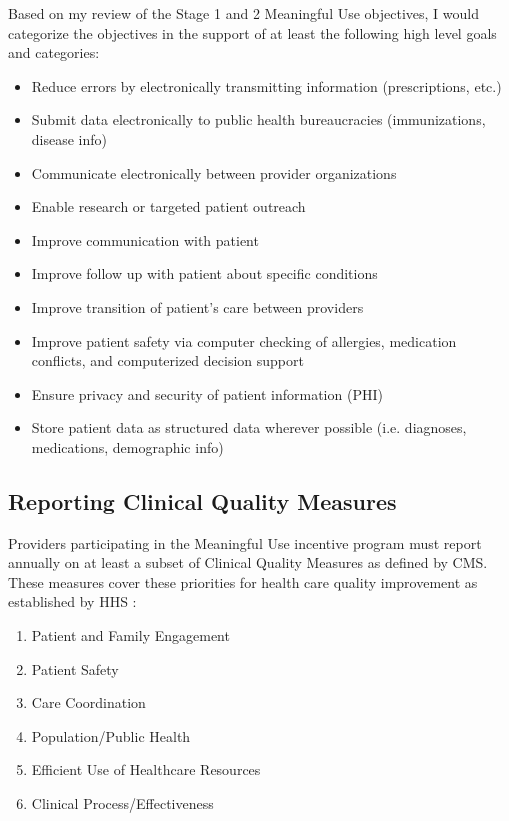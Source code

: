 \documentclass[10pt]{article}
\begin{document}


Based on my review of the Stage 1 and 2 Meaningful Use objectives, I would categorize the objectives in the support of at least the following high level goals and categories:
\begin{itemize}
	\item Reduce errors by electronically transmitting information (prescriptions, etc.)
	\item Submit data electronically to public health bureaucracies (immunizations, disease info)
	\item Communicate electronically between provider organizations
	\item Enable research or targeted patient outreach
	\item Improve communication with patient
	\item Improve follow up with patient about specific conditions
	\item Improve transition of patient's care between providers
	\item Improve patient safety via computer checking of allergies, medication conflicts, and computerized decision support
	\item Ensure privacy and security of patient information (PHI)
	\item Store patient data as structured data wherever possible (i.e. diagnoses, medications, demographic info)
\end{itemize}

\subsection{Reporting Clinical Quality Measures}
\label{sec:CQM}



Providers participating in the Meaningful Use incentive program must report annually on at least a subset of Clinical Quality Measures as defined by CMS.
These measures cover these priorities for health care quality improvement as established by HHS \cite{cqm-intro}:
\begin{enumerate}
	\item Patient and Family Engagement
	\item Patient Safety
	\item Care Coordination
	\item Population/Public Health
	\item Efficient Use of Healthcare Resources
	\item Clinical Process/Effectiveness
\end{enumerate}
\end{document}
